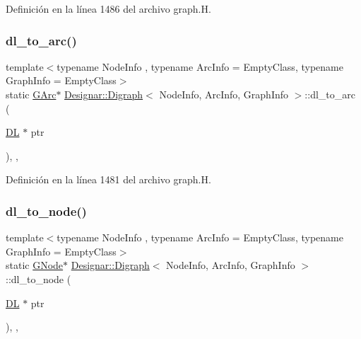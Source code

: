 Definición en la línea 1486 del archivo graph.\+H.

\mbox{\label{class_designar_1_1_digraph_af9581e9d0825da11ce153bd055149f7f}} 
\subsubsection{\texorpdfstring{dl\+\_\+to\+\_\+arc()}{dl\_to\_arc()}}
{\footnotesize\ttfamily template$<$typename Node\+Info , typename Arc\+Info  = Empty\+Class, typename Graph\+Info  = Empty\+Class$>$ \\
static \hyperlink{class_designar_1_1_digraph_a341acf8fb0195a8986158c29c4db1a89}{G\+Arc}$\ast$ \hyperlink{class_designar_1_1_digraph}{Designar\+::\+Digraph}$<$ Node\+Info, Arc\+Info, Graph\+Info $>$\+::dl\+\_\+to\+\_\+arc (\begin{DoxyParamCaption}\item[{\hyperlink{class_designar_1_1_d_l}{DL} $\ast$}]{ptr }\end{DoxyParamCaption})\hspace{0.3cm}{\ttfamily [inline]}, {\ttfamily [static]}, {\ttfamily [protected]}}



Definición en la línea 1481 del archivo graph.\+H.

\mbox{\label{class_designar_1_1_digraph_adbb91274c17d6087fdd5721e3f9b1f7c}} 
\subsubsection{\texorpdfstring{dl\+\_\+to\+\_\+node()}{dl\_to\_node()}}
{\footnotesize\ttfamily template$<$typename Node\+Info , typename Arc\+Info  = Empty\+Class, typename Graph\+Info  = Empty\+Class$>$ \\
static \hyperlink{class_designar_1_1_digraph_a33b0d2b8820ada501522b0e67e63524a}{G\+Node}$\ast$ \hyperlink{class_designar_1_1_digraph}{Designar\+::\+Digraph}$<$ Node\+Info, Arc\+Info, Graph\+Info $>$\+::dl\+\_\+to\+\_\+node (\begin{DoxyParamCaption}\item[{\hyperlink{class_designar_1_1_d_l}{DL} $\ast$}]{ptr }\end{DoxyParamCaption})\hspace{0.3cm}{\ttfamily [inline]}, {\ttfamily [static]}, {\ttfamily [protected]}}



